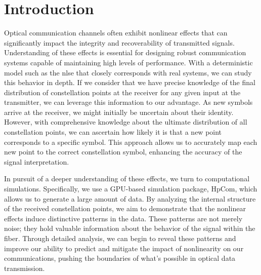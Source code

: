 

\section{Introduction}
Optical communication channels often exhibit nonlinear effects that can significantly impact the integrity and recoverability of transmitted signals. Understanding of these effects is essential for designing robust communication systems capable of maintaining high levels of performance. 
With a deterministic model such as the \Gls{nlse} that closely corresponds with real systems, we can study this behavior in depth. If we consider that we have precise knowledge of the final distribution of constellation points at the receiver for any given input at the transmitter, we can leverage this information to our advantage. As new symbols arrive at the receiver, we might initially be uncertain about their identity. However, with comprehensive knowledge about the ultimate distribution of all constellation points, we can ascertain how likely it is that a new point corresponds to a specific symbol. This approach allows us to accurately map each new point to the correct constellation symbol, enhancing the accuracy of the signal interpretation.

In pursuit of a deeper understanding of these effects, we turn to computational simulations. Specifically, we use a GPU-based simulation package, HpCom, which allows us to generate a large amount of data. By analyzing the internal structure of the received constellation points, we aim to demonstrate that the nonlinear effects induce distinctive patterns in the data. These patterns are not merely noise; they hold valuable information about the behavior of the signal within the fiber. Through detailed analysis, we can begin to reveal these patterns and improve our ability to predict and mitigate the impact of nonlinearity on our communications, pushing the boundaries of what's possible in optical data transmission. 



